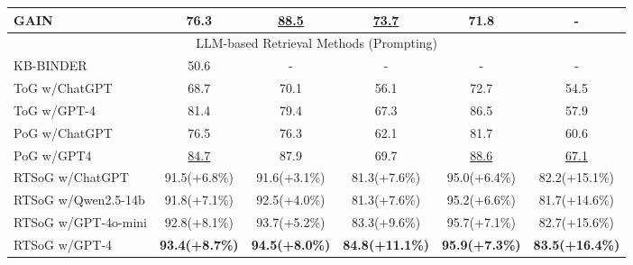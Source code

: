 \documentclass[lettersize,journal]{IEEEtran}
\begin{document}
\begin{table}[h]
\begin{tabular}{cccccc}
\multicolumn{1}{l}{GAIN}                     & 76.3    & \underline{88.5}  & \underline{73.7}          & 71.8     & -                                                 \\ \midrule
\multicolumn{6}{c}{LLM-based Retrieval Methods (Prompting)}                                                                            \\ \midrule
\multicolumn{1}{l}{KB-BINDER}                & 50.6    & -     & -             & -        & -                                                 \\
\multicolumn{1}{l}{ToG w/ChatGPT}            & 68.7    & 70.1  & 56.1          & 72.7     & 54.5                                                 \\
\multicolumn{1}{l}{ToG w/GPT-4}              & 81.4    & 79.4  & 67.3          & 86.5     & 57.9                                              \\
\multicolumn{1}{l}{PoG w/ChatGPT}            & 76.5    & 76.3  & 62.1          & 81.7     & 60.6                                                \\
\multicolumn{1}{l}{PoG w/GPT4}               & \underline{84.7}    & 87.9  & 69.7          & \underline{88.6}     & \underline{67.1}                                              \\ \midrule
\multicolumn{1}{l}{RTSoG w/ChatGPT}           & 91.5(+6.8\%)    & 91.6(+3.1\%)   & 81.3(+7.6\%)         & 95.0(+6.4\%)     & 82.2(+15.1\%)                                                  \\
\multicolumn{1}{l}{RTSoG w/Qwen2.5-14b}       & 91.8(+7.1\%)    & 92.5(+4.0\%)      & 81.3(+7.6\%)              & 95.2(+6.6\%)         & 81.7(+14.6\%)                                                   \\
\multicolumn{1}{l}{RTSoG w/GPT-4o-mini}       & 92.8(+8.1\%)    & 93.7(+5.2\%)      & 83.3(+9.6\%)               & 95.7(+7.1\%)         & 82.7(+15.6\%)                                                  \\
\multicolumn{1}{l}{RTSoG w/GPT-4}             & \textbf{93.4}\textbf{(+8.7\%)}    & \textbf{94.5}\textbf{(+8.0\%)}      & \textbf{84.8}\textbf{(+11.1\%)}              & \textbf{95.9}\textbf{(+7.3\%)}        & \textbf{83.5}\textbf{(+16.4\%)}                                                  \\ \bottomrule
\end{tabular}
\label{tab3}
\end{table}
\end{document}
